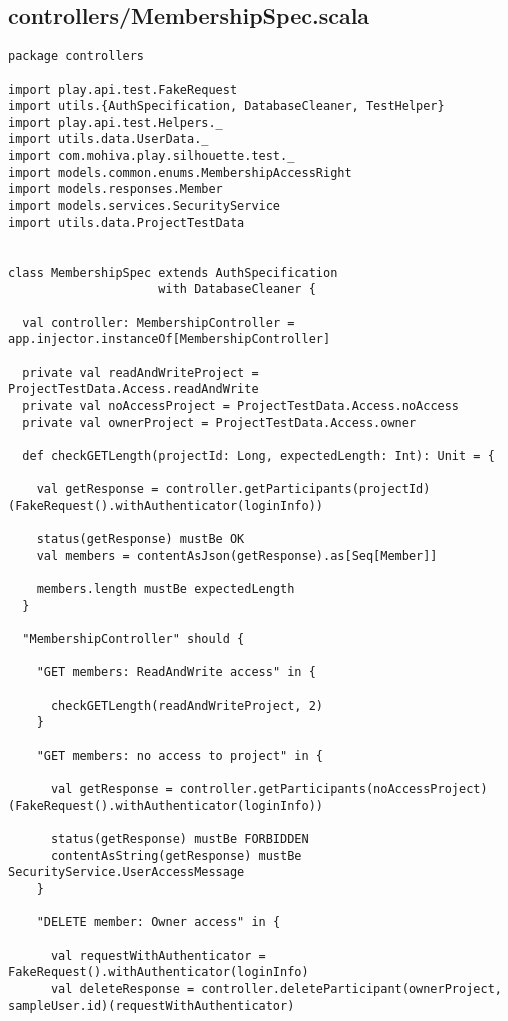 \subsection{controllers/MembershipSpec.scala}
\begin{lstlisting}
package controllers

import play.api.test.FakeRequest
import utils.{AuthSpecification, DatabaseCleaner, TestHelper}
import play.api.test.Helpers._
import utils.data.UserData._
import com.mohiva.play.silhouette.test._
import models.common.enums.MembershipAccessRight
import models.responses.Member
import models.services.SecurityService
import utils.data.ProjectTestData


class MembershipSpec extends AuthSpecification
                     with DatabaseCleaner {

  val controller: MembershipController = app.injector.instanceOf[MembershipController]

  private val readAndWriteProject = ProjectTestData.Access.readAndWrite
  private val noAccessProject = ProjectTestData.Access.noAccess
  private val ownerProject = ProjectTestData.Access.owner

  def checkGETLength(projectId: Long, expectedLength: Int): Unit = {

    val getResponse = controller.getParticipants(projectId)(FakeRequest().withAuthenticator(loginInfo))

    status(getResponse) mustBe OK
    val members = contentAsJson(getResponse).as[Seq[Member]]

    members.length mustBe expectedLength
  }

  "MembershipController" should {

    "GET members: ReadAndWrite access" in {

      checkGETLength(readAndWriteProject, 2)
    }

    "GET members: no access to project" in {

      val getResponse = controller.getParticipants(noAccessProject)(FakeRequest().withAuthenticator(loginInfo))

      status(getResponse) mustBe FORBIDDEN
      contentAsString(getResponse) mustBe SecurityService.UserAccessMessage
    }

    "DELETE member: Owner access" in {

      val requestWithAuthenticator = FakeRequest().withAuthenticator(loginInfo)
      val deleteResponse = controller.deleteParticipant(ownerProject, sampleUser.id)(requestWithAuthenticator)


\end{lstlisting}
